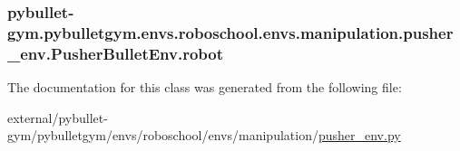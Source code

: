 \subsubsection[{\texorpdfstring{robot}{robot}}]{\setlength{\rightskip}{0pt plus 5cm}pybullet-\/gym.\+pybulletgym.\+envs.\+roboschool.\+envs.\+manipulation.\+pusher\+\_\+env.\+Pusher\+Bullet\+Env.\+robot}\hypertarget{classpybullet-gym_1_1pybulletgym_1_1envs_1_1roboschool_1_1envs_1_1manipulation_1_1pusher__env_1_1_pusher_bullet_env_a26e16458010d2972c7d2e4cfeb51aabf}{}\label{classpybullet-gym_1_1pybulletgym_1_1envs_1_1roboschool_1_1envs_1_1manipulation_1_1pusher__env_1_1_pusher_bullet_env_a26e16458010d2972c7d2e4cfeb51aabf}


The documentation for this class was generated from the following file\+:\begin{DoxyCompactItemize}
\item 
external/pybullet-\/gym/pybulletgym/envs/roboschool/envs/manipulation/\hyperlink{roboschool_2envs_2manipulation_2pusher__env_8py}{pusher\+\_\+env.\+py}\end{DoxyCompactItemize}
